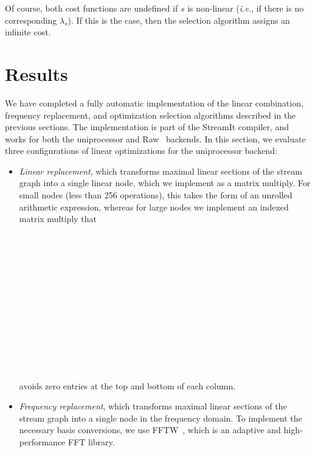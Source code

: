 \documentclass{sig-alternate}
\begin{document}
{Of course, both cost functions are undefined if $s$ is non-linear
({\it i.e.}, if there is no corresponding $\lambda_s$). If this is the
case, then the selection algorithm assigns an infinite cost.



\section{Results}
\label{sec:results}

We have completed a fully automatic implementation of the linear
combination, frequency replacement, and optimization selection
algorithms described in the previous sections.  The implementation is
part of the StreamIt compiler, and works for both the uniprocessor and
Raw~\cite{raw-micro} backends.  In this section, we evaluate three
configurations of linear optimizations for the uniprocessor backend:
\begin{itemize}

\item {\it Linear replacement}, which transforms maximal linear
sections of the stream graph into a single linear node, which we
implement as a matrix multiply.  For small nodes (less than 256
operations), this takes the form of an unrolled arithmetic expression,
whereas for large nodes we implement an indexed matrix multiply that \\
~ \\
~ \\
~ \\
~ \\
~ \\
~ \\
~ \\
~ \\
~ \\
~ \\
~ \\
~ \\
~ \\
avoids zero entries at the top and bottom of each column.

\item {\it Frequency replacement}, which transforms maximal linear
sections of the stream graph into a single node in the frequency
domain.  To implement the necessary basis conversions, we use
FFTW~\cite{frigo99fast}, which is an adaptive and high-performance FFT
library.


\end{itemize}}
\end{document}
